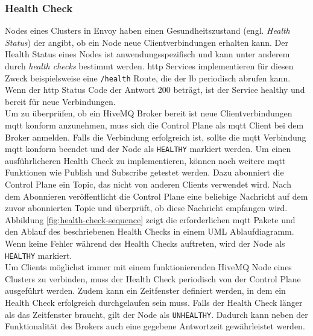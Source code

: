 \subsubsection{Health Check} \label{ss:health-check}
Nodes eines Clusters in Envoy haben einen Gesundheitszustand (engl. \textit{Health Status}) der angibt, ob ein Node neue Clientverbindungen erhalten kann.
Der Health Status eines Nodes ist anwendungsspezifisch und kann unter anderem durch \textit{health checks} bestimmt werden.
\ac{http} Services implementieren für diesen Zweck beispielsweise eine \verb|/health| Route, die der \acl{lb} periodisch abrufen kann. Wenn der \ac{http} Status Code der Antwort 200 beträgt, ist der Service healthy und bereit für neue Verbindungen.
\\
Um zu überprüfen, ob ein HiveMQ Broker bereit ist neue Clientverbindungen \ac{mqtt} konform anzunehmen, muss sich die Control Plane als \ac{mqtt} Client bei dem Broker anmelden. Falls die Verbindung erfolgreich ist, sollte die \ac{mqtt} Verbindung \ac{mqtt} konform beendet und der Node als \verb|HEALTHY| markiert werden.
Um einen ausführlicheren Health Check zu implementieren, können noch weitere \ac{mqtt} Funktionen wie Publish und Subscribe getestet werden. Dazu abonniert die Control Plane ein Topic, das nicht von anderen Clients verwendet wird. Nach dem Abonnieren veröffentlicht die Control Plane eine beliebige Nachricht auf dem zuvor abonnierten Topic und überprüft, ob diese Nachricht empfangen wird. Abbildung \ref{fig:health-check-sequence} zeigt die erforderlichen \ac{mqtt} Pakete und den Ablauf des beschriebenen Health Checks in einem UML Ablaufdiagramm. Wenn keine Fehler während des Health Checks auftreten, wird der Node als \verb|HEALTHY| markiert.
\\
Um Clients möglichst immer mit einem funktionierenden HiveMQ Node eines Clusters zu verbinden, muss der Health Check periodisch von der Control Plane ausgeführt werden.
Zudem kann ein Zeitfenster definiert werden, in dem ein Health Check erfolgreich durchgelaufen sein muss. Falls der Health Check länger als das Zeitfenster braucht, gilt der Node als \verb|UNHEALTHY|. Dadurch kann neben der Funktionalität des Brokers auch eine gegebene Antwortzeit gewährleistet werden.
